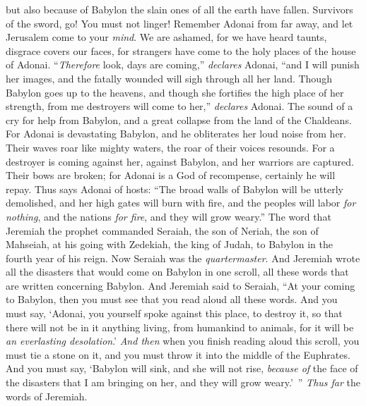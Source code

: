 \begin{biblechapter}
but also because of Babylon the slain ones of all the earth have fallen.
\verse Survivors of the sword, go! 
You must not linger! 
Remember Adonai from far away, 
and let Jerusalem come to your \textit{mind}.
\verse We are ashamed, 
for we have heard taunts, 
disgrace covers our faces, 
for strangers have come to the holy places of the house of Adonai.
\verse “\textit{Therefore} look, days are coming,” \textit{declares} Adonai, 
“and I will punish her images, 
and the fatally wounded will sigh through all her land.
\verse Though Babylon goes up to the heavens, 
and though she fortifies the high place of her strength, 
from me destroyers will come to her,” \textit{declares} Adonai.
\verse The sound of a cry for help from Babylon, 
and a great collapse from the land of the Chaldeans.
\verse For Adonai is devastating Babylon, 
and he obliterates her loud noise from her. 
Their waves roar like mighty waters, 
the roar of their voices resounds.
\verse For a destroyer is coming against her, against Babylon, 
and her warriors are captured. 
Their bows are broken; 
for Adonai is a God of recompense, 
certainly he will repay.
\verse Thus says Adonai of hosts: “The broad walls of Babylon will be utterly demolished, 
and her high gates will burn with fire, 
and the peoples will labor \textit{for nothing}, 
and the nations \textit{for fire}, 
and they will grow weary.”
 The word that Jeremiah the prophet commanded Seraiah, the son of Neriah, the son of Mahseiah, at his going with Zedekiah, the king of Judah, to Babylon in the fourth year of his reign. Now Seraiah was the \textit{quartermaster}.
\verse And Jeremiah wrote all the disasters that would come on Babylon in one scroll, all these words that are written concerning Babylon.
\verse And Jeremiah said to Seraiah, “At your coming to Babylon, then you must see that you read aloud all these words.
\verse And you must say, ‘Adonai, you yourself spoke against this place, to destroy it, so that there will not be in it anything living, from humankind to animals, for it will be \textit{an everlasting desolation}.’
\verse \textit{And then} when you finish reading aloud this scroll, you must tie a stone on it, and you must throw it into the middle of the Euphrates.
\verse And you must say, ‘Babylon will sink, and she will not rise, \textit{because of} the face of the disasters that I am bringing on her, and they will grow weary.’ ” \textit{Thus far} the words of Jeremiah.
\end{biblechapter}

